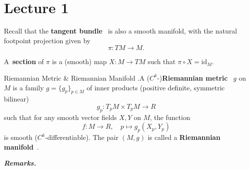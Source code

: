 \documentclass{article}
\begin{document}
\section{Lecture 1}
\label{sec:lecture1}

Recall that the \textbf{tangent bundle}~ is also a smooth manifold, with the natural footpoint projection given by
\begin{equation}
  \pi : TM \to M.
\end{equation}

A~\textbf{section} of $\pi$ is a (smooth) map $X: M \to TM$ such that $\pi \circ X = \text{id}_M$.

\begin{Definition}{Riemannian Metric \& Riemannian Manifold}
  .A ($C^k$-)\textbf{Riemannian metric}~ $g$ on $M$ is a family $g = \{ g_p\}_{p \in M}$ of inner products (positive definite, symmetric bilinear)
\begin{equation}
  g_p: T_pM \times T_pM \rightarrow R
\end{equation}
such that for any smooth vector fields $X, Y$ on $M$, the function
\begin{equation}
  f : M \rightarrow R, \quad p \mapsto g_p (X_p, Y_p)
\end{equation}
is smooth ($C^k$-differentiable). The pair $(M, g)$ is called a \textbf{Riemannian manifold}~.
\end{Definition}

\textit{\textbf{Remarks.}}
\end{document}
